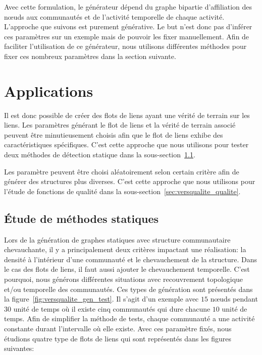 Avec cette formulation, le générateur dépend du graphe bipartie d'affiliation des n\oe uds aux communautés et de l'activité temporelle de chaque activité.
L'approche que suivons est purement générative.
Le but n'est donc pas d'inférer ces paramètres sur un exemple mais de pouvoir les fixer manuellement.
Afin de faciliter l'utilisation de ce générateur, nous utilisons différentes méthodes pour fixer ces nombreux paramètres dans la section suivante.


\section{Applications}
\label{sec:versqualite_Applications}

Il est donc possible de créer des flots de liens ayant une vérité de terrain sur les liens.
Les paramètres générant le flot de liens et la vérité de terrain associé peuvent être minutieusement choisis afin que le flot de liens exhibe des caractéristiques spécifiques.
C'est cette approche que nous utilisons pour tester deux méthodes de détection statique dans la sous-section~\ref{sec:versqualite_statique}.

Les paramètre peuvent être choisi aléatoirement selon certain critère  afin de générer des structures plus diverses.
C'est cette approche que nous utilisons pour l'étude de fonctions de qualité dans la sous-section~\ref{sec:versqualite_qualite}.



\subsection{Étude de méthodes statiques}
\label{sec:versqualite_statique}

Lors de la génération de graphes statiques avec structure communautaire chevauchante, il y a principalement deux critères impactant une réalisation: la densité à l'intérieur d'une communauté et le chevauchement de la structure.
Dans le cas des flots de liens, il faut aussi ajouter le chevauchement temporelle.
C'est pourquoi, nous générons différentes situations avec recouvrement topologique et/ou temporelle des communautés. 
Ces types de génération sont présentés dans la figure~\ref{fig:versqualite_gen_test}.
Il s'agit d'un exemple avec $15$ n\oe uds pendant $30$ unité de temps où il existe cinq communautés qui dure chacune $10$ unité de temps.
Afin de simplifier la méthode de tests, chaque communauté a une activité constante durant l'intervalle où elle existe.
Avec ces paramètre fixés, nous étudions quatre type de flots de liens qui sont représentés dans les figures suivantes:

